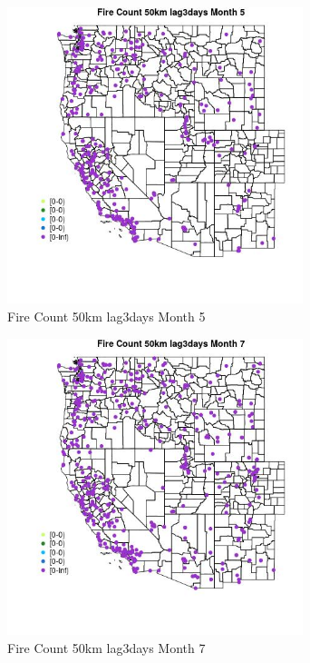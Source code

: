 \begin{figure} 
\centering  
\includegraphics[width=0.77\textwidth]{Code_Outputs/Report_ML_input_PM25_Step4_part_e_de_duplicated_aves_compiled_2019-05-18wNAs_MapObsMo5Fire_Count_50km_lag3days.jpg} 
\caption{\label{fig:Report_ML_input_PM25_Step4_part_e_de_duplicated_aves_compiled_2019-05-18wNAsMapObsMo5Fire_Count_50km_lag3days}Fire Count 50km lag3days Month 5} 
\end{figure} 
 

\begin{figure} 
\centering  
\includegraphics[width=0.77\textwidth]{Code_Outputs/Report_ML_input_PM25_Step4_part_e_de_duplicated_aves_compiled_2019-05-18wNAs_MapObsMo7Fire_Count_50km_lag3days.jpg} 
\caption{\label{fig:Report_ML_input_PM25_Step4_part_e_de_duplicated_aves_compiled_2019-05-18wNAsMapObsMo7Fire_Count_50km_lag3days}Fire Count 50km lag3days Month 7} 
\end{figure} 
 

